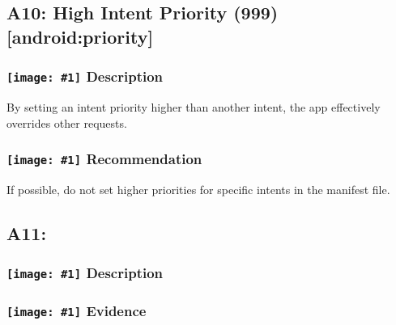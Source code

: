 \documentclass[12p]{article}
\newcommand{\icon}[1]{\texttt{[image: \#1]}}
\begin{document}
\subsection{A10: High Intent Priority (999) [android:priority]}
\subsubsection*{\protect\icon{/home/miki/Documents/GITHUB/AndroidPermissions/python/vulns/report_icons/basic_sheet.png} Description}
By setting an intent priority higher than another intent, the app effectively overrides other requests.
\subsubsection*{\protect\icon{/home/miki/Documents/GITHUB/AndroidPermissions/python/vulns/report_icons/basic_todo.png} Recommendation}
If possible, do not set higher priorities for specific intents in the manifest file.
\subsection{A11: }
\subsubsection*{\protect\icon{/home/miki/Documents/GITHUB/AndroidPermissions/python/vulns/report_icons/basic_sheet.png} Description}

\subsubsection*{\protect\icon{/home/miki/Documents/GITHUB/AndroidPermissions/python/vulns/report_icons/basic_magnifier.png} Evidence}





\end{document}

